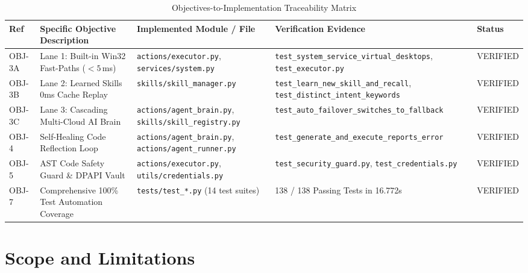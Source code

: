 \documentclass[12pt,letterpaper,oneside]{report}
\begin{document}
\begin{table}[H]
\centering
\caption{Objectives-to-Implementation Traceability Matrix}
\label{tab:traceability}
\begin{tabularx}{\textwidth}{|l|X|l|X|l|}
\hline
\textbf{Ref} & \textbf{Specific Objective Description} & \textbf{Implemented Module / File} & \textbf{Verification Evidence} & \textbf{Status}\\ \hline
OBJ-3A & Lane 1: Built-in Win32 Fast-Paths ($<5$\,ms) & \texttt{actions/executor.py}, \texttt{services/system.py} & \texttt{test\_system\_service\_virtual\_desktops}, \texttt{test\_executor.py} & VERIFIED\\ \hline
OBJ-3B & Lane 2: Learned Skills 0ms Cache Replay & \texttt{skills/skill\_manager.py} & \texttt{test\_learn\_new\_skill\_and\_recall}, \texttt{test\_distinct\_intent\_keywords} & VERIFIED\\ \hline
OBJ-3C & Lane 3: Cascading Multi-Cloud AI Brain & \texttt{actions/agent\_brain.py}, \texttt{skills/skill\_registry.py} & \texttt{test\_auto\_failover\_switches\_to\_fallback} & VERIFIED\\ \hline
OBJ-4 & Self-Healing Code Reflection Loop & \texttt{actions/agent\_brain.py}, \texttt{actions/agent\_runner.py} & \texttt{test\_generate\_and\_execute\_reports\_error} & VERIFIED\\ \hline
OBJ-5 & AST Code Safety Guard \& DPAPI Vault & \texttt{actions/executor.py}, \texttt{utils/credentials.py} & \texttt{test\_security\_guard.py}, \texttt{test\_credentials.py} & VERIFIED\\ \hline
OBJ-7 & Comprehensive 100\% Test Automation Coverage & \texttt{tests/test\_*.py} (14 test suites) & 138 / 138 Passing Tests in 16.772s & VERIFIED\\ \hline
\end{tabularx}
\end{table}

\section{Scope and Limitations}
\end{document}

